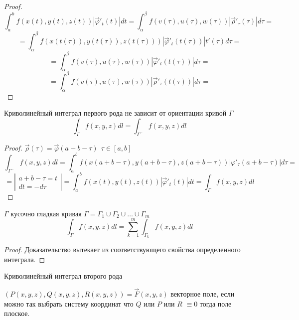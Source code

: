 \begin{proof}
  $$
  \int_a^b f(x(t), y(t), z(t))|\vec \varphi'_t(t)|dt =
  \int_{\alpha}^{\beta} f(v(\tau), u(\tau), w(\tau))
  |\vec \rho'_{\tau}(\tau)|d\tau =
  $$
  $$
  = \int_{\alpha}^{\beta} f(x(t(\tau)), y(t(\tau)), z(t(\tau)))
  |\vec \varphi'_t(t(\tau))| t'(\tau)d\tau =
  $$
  $$
  = \int_{\alpha}^{\beta} f(v(\tau), u(\tau), w(\tau))
  |\vec \varphi'_t(t(\tau))| d\tau =
  $$
  $$
  = \int_{\alpha}^{\beta} f(v(\tau), u(\tau), w(\tau))
  |\vec \rho'_{\tau}(t(\tau))| d\tau =
  $$
\end{proof}

\begin{theorem}
  Криволинейный интеграл первого рода не зависит от ориентации кривой $\Gamma$
  $$
  \int_{\Gamma} f(x,y,z) d l = \int_{\Gamma^-} f(x,y,z) d l
  $$
\end{theorem}

\begin{proof}
  $\vec \rho (\tau) = \vec \varphi (a+b-\tau) ~~ \tau \in [a,b]$
  $$
  \int_{\Gamma^-} f(x,y,z) d l = \int_a^b
  f(x(a+b-\tau),y(a+b-\tau),z(a+b-\tau)) |\varphi'_{\tau}(a+b-\tau)|d \tau =
  $$
  $$
  =
  \left|
    \begin{array}{l}
      a+b-\tau = t \\
      dt = -d\tau
    \end{array}
  \right|
  = \int_a^b f(x(t),y(t),z(t))
  |\vec \varphi'_t(t)| dt = \int_{\Gamma} f(x,y,z) dl
  $$
\end{proof}

\begin{theorem}
  $\Gamma$ кусочно гладкая кривая $\Gamma = \Gamma_1 \cup \Gamma_2 \cup
  \ldots \cup \Gamma_m$
  $$
  \int_{\Gamma} f(x,y,z) d l = \sum_{k=1}^m \int_{\Gamma_k} f(x,y,z) d l
  $$
\end{theorem}

\begin{proof}
  Доказательство вытекает из соответствующего свойства определенного интеграла.
\end{proof}

\begin{title}[\Large]
  Криволинейный интеграл второго рода
\end{title}

\begin{define}
  $(P(x,y,z), Q(x,y,z), R(x,y,z)) = \vec F(x,y,z)$
  векторное поле,
  если можно так выбрать систему координат что $Q$ или $P$ или $R$ $\equiv 0$
  тогда поле плоское.
\end{define}

